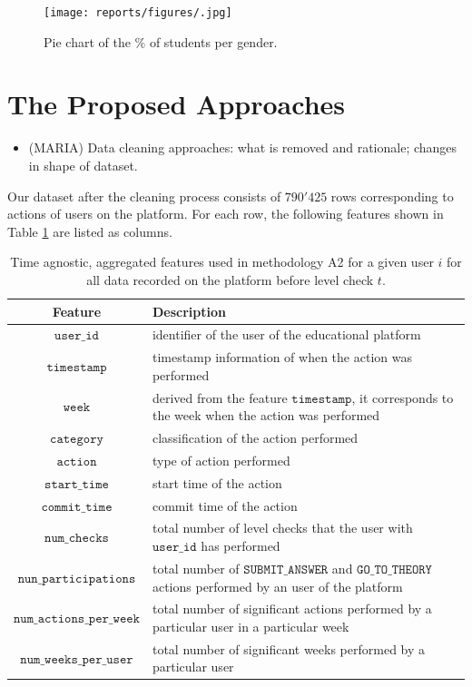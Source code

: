 \documentclass[sigplan,screen]{acmart}
\begin{document}
\begin{figure}[!ht]
    \centering
    \texttt{[image: reports/figures/.jpg]}
    \caption{Pie chart of the \% of students per gender.}
    \label{fig:cantonal_representation}
\end{figure}

\section{The Proposed Approaches}\label{sec:propapp}

{\color{red}
\begin{itemize}
    \item (MARIA) Data cleaning approaches: what is removed and rationale; changes in shape of dataset.
\end{itemize}
}

Our dataset after the cleaning process consists of $790'425$ rows corresponding to actions of users on the platform. For each row, the following features shown in Table \ref{tab:features} are listed as columns.

\begin{table}[!ht]
  \caption{Time agnostic, aggregated features used in methodology A2 for a given user $i$ for all data recorded on the platform before level check $t$.}
  \label{tab:features}
  \begin{tabular}{cl}
    \toprule
    \textbf{Feature}&\textbf{Description}\\
    \midrule
    $\texttt{user\_id}$ & identifier of the user of the educational platform \\
    $\texttt{timestamp}$ & timestamp information of when the action was performed \\
    $\texttt{week}$ & derived from the feature $\texttt{timestamp}$, it corresponds to the week when the action was performed \\
    $\texttt{category}$ & classification of the action performed \\
    $\texttt{action}$ & type of action performed \\
    $\texttt{start\_time}$ & start time of the action \\
    $\texttt{commit\_time}$ & commit time of the action \\
    $\texttt{num\_checks}$ & total number of level checks that the user with $\texttt{user\_id}$ has performed \\
    $\texttt{nun\_participations}$ & total number of $\texttt{SUBMIT\_ANSWER}$ and $\texttt{GO\_TO\_THEORY}$ actions performed by an user of the platform \\
    $\texttt{num\_actions\_per\_week}$ & total number of significant actions performed by a particular user in a particular week \\
    $\texttt{num\_weeks\_per\_user}$ & total number of significant weeks performed by a particular user \\
    \bottomrule
    \end{tabular}
\end{table}
\end{document}
